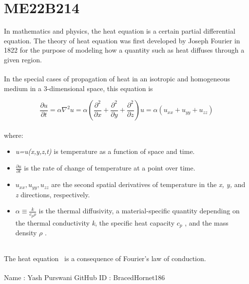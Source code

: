 \section{ME22B214}

In mathematics and physics, the heat equation is a certain partial differential equation. The theory of heat equation was first developed by Joseph Fourier in 1822 for the purpose of modeling how a quantity such as heat diffuses through a given region.
\\ \\
In the special cases of propagation of heat in an isotropic and homogeneous medium in a 3-dimensional space, this equation is

\begin{equation}
    \frac{\partial u}{\partial t} = \alpha\nabla^2u = \alpha \left(\frac{\partial^2}{\partial x}+\frac{\partial^2}{\partial y}+\frac{\partial^2}{\partial z}\right)u = \alpha(u_{xx}+u_{yy}+u_{zz})
    \label {eqn:heat}
\end{equation}
\\
where:
\begin{itemize}
    \item \emph{u=u(x,y,z,t)} is temperature as a function of space and time. 
    \item $\frac{\partial u}{\partial t}$ is the rate of change of temperature at a point over time.
    \item $u_{xx},u_{yy},u_{zz}$ are the second spatial derivatives of temperature in the \emph{x, y,} and \emph{z} directions, respectively.
    \item $\alpha \equiv \frac{k}{c_p\rho}$ is the thermal diffusivity, a material-specific quantity depending on the thermal conductivity \emph{k}, the specific heat capacity $c_p$ , and the mass density $\rho$ .
\end{itemize}
\\
The heat equation~\cite{heat_equation} is a consequence of Fourier's law of conduction.\\
\\
Name : Yash Purswani
GitHub ID : BracedHornet186


